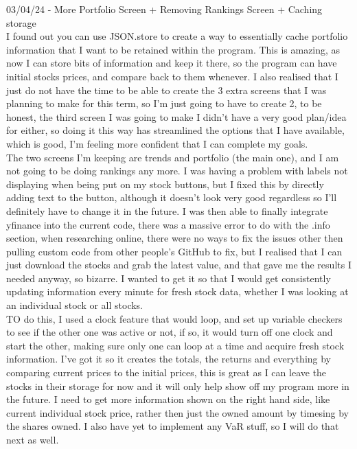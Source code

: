 \documentclass{article}
\begin{document}
03/04/24 - More Portfolio Screen + Removing Rankings Screen + Caching storage\\
I found out you can use JSON.store to create a way to essentially cache portfolio information that I want to be retained within the program. This is amazing, as now I can store bits of information and keep it there, so the program can have initial stocks prices, and compare back to them whenever. I also realised that I just do not have the time to be able to create the 3 extra screens that I was planning to make for this term, so I'm just going to have to create 2, to be honest, the third screen I was going to make I didn't have a very good plan/idea for either, so doing it this way has streamlined the options that I have available, which is good, I'm feeling more confident that I can complete my goals. \\The two screens I'm keeping are trends and portfolio (the main one), and I am not going to be doing rankings any more. I was having a problem with labels not displaying when being put on my stock buttons, but I fixed this by directly adding text to the button, although it doesn't look very good regardless so I'll definitely have to change it in the future. I was then able to finally integrate yfinance into the current code, there was a massive error to do with the .info section, when researching online, there were no ways to fix the issues other then pulling custom code from other people's GitHub to fix, but I realised that I can just download the stocks and grab the latest value, and that gave me the results I needed anyway, so bizarre. I wanted to get it so that I would get consistently updating information every minute for fresh stock data, whether I was looking at an individual stock or all stocks. \\TO do this, I used a clock feature that would loop, and set up variable checkers to see if the other one was active or not, if so, it would turn off one clock and start the other, making sure only one can loop at a time and acquire fresh stock information. I've got it so it creates the totals, the returns and everything by comparing current prices to the initial prices, this is great as I can leave the stocks in their storage for now and it will only help show off my program more in the future. I need to get more information shown on the right hand side, like current individual stock price, rather then just the owned amount by timesing by the shares owned. I also have yet to implement any VaR stuff, so I will do that next as well.\\\vspace{0.3cm}
\end{document}
